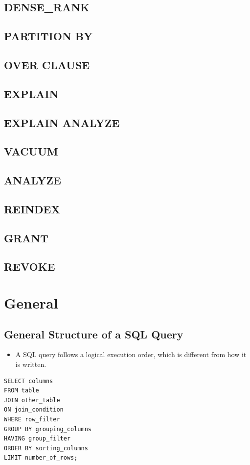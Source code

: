 \documentclass[10pt]{article}
\newcommand{\newbp}{%
  \newpage
  \mbox{}
  \newpage
}
\begin{document}
\subsection{DENSE\_RANK}
\subsection{PARTITION BY}
\subsection{OVER CLAUSE}
\subsection{EXPLAIN}
\subsection{EXPLAIN ANALYZE}
\subsection{VACUUM}
\subsection{ANALYZE}
\subsection{REINDEX}
\subsection{GRANT}
\subsection{REVOKE}

\newbp 
\section{General}

\subsection{General Structure of a SQL Query}
\begin{itemize}
\item A SQL query follows a logical execution order, which is different from how it is written.
\end{itemize}

\begin{verbatim}
SELECT columns
FROM table
JOIN other_table
ON join_condition
WHERE row_filter
GROUP BY grouping_columns
HAVING group_filter
ORDER BY sorting_columns
LIMIT number_of_rows;
\end{verbatim}
\end{document}
